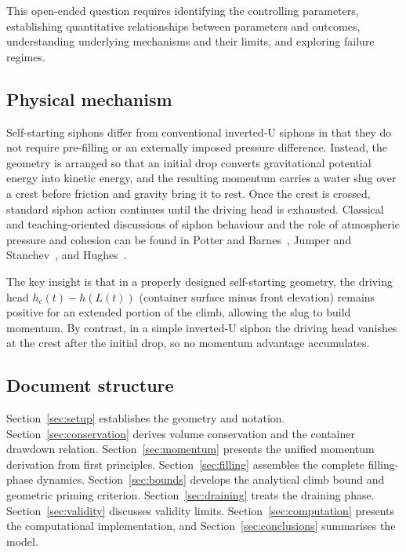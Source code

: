 \documentclass[11pt]{article}
\theoremstyle{definition}
\begin{document}
This open-ended question requires identifying the controlling parameters, establishing 
quantitative relationships between parameters and outcomes, understanding underlying 
mechanisms and their limits, and exploring failure regimes.

\subsection{Physical mechanism}

Self-starting siphons differ from conventional inverted-U siphons in that they do not require 
pre-filling or an externally imposed pressure difference. Instead, the geometry is arranged 
so that an initial drop converts gravitational potential energy into kinetic energy, and the 
resulting momentum carries a water slug over a crest before friction and gravity bring it to 
rest. Once the crest is crossed, standard siphon action continues until the driving head is 
exhausted. Classical and teaching-oriented discussions of siphon behaviour and the role of 
atmospheric pressure and cohesion can be found in Potter and Barnes~\cite{potter_barnes}, 
Jumper and Stanchev~\cite{jumper_stanchev}, and Hughes~\cite{hughes_practical}.

The key insight is that in a properly designed self-starting geometry, the driving head 
$h_c(t) - h(L(t))$ (container surface minus front elevation) remains positive for an extended 
portion of the climb, allowing the slug to build momentum. By contrast, in a simple inverted-U 
siphon the driving head vanishes at the crest after the initial drop, so no momentum advantage 
accumulates.

\subsection{Document structure}

Section~\ref{sec:setup} establishes the geometry and notation. Section~\ref{sec:conservation} 
derives volume conservation and the container drawdown relation. Section~\ref{sec:momentum} 
presents the unified momentum derivation from first principles. Section~\ref{sec:filling} 
assembles the complete filling-phase dynamics. Section~\ref{sec:bounds} develops the 
analytical climb bound and geometric priming criterion. Section~\ref{sec:draining} treats 
the draining phase. Section~\ref{sec:validity} discusses validity limits. 
Section~\ref{sec:computation} presents the computational implementation, and 
Section~\ref{sec:conclusions} summarises the model.
\end{document}
